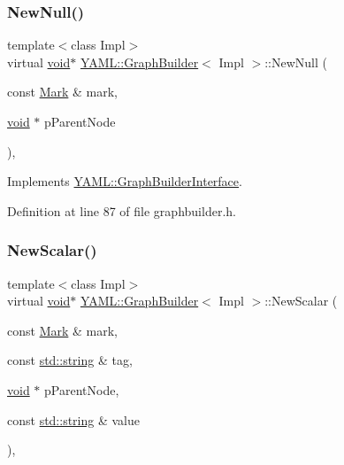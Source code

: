 \subsubsection{\texorpdfstring{NewNull()}{NewNull()}}
{\footnotesize\ttfamily template$<$class Impl$>$ \\
virtual \mbox{\hyperlink{glad_8h_a950fc91edb4504f62f1c577bf4727c29}{void}}$\ast$ \mbox{\hyperlink{class_y_a_m_l_1_1_graph_builder}{Y\+A\+M\+L\+::\+Graph\+Builder}}$<$ Impl $>$\+::New\+Null (\begin{DoxyParamCaption}\item[{const \mbox{\hyperlink{struct_y_a_m_l_1_1_mark}{Mark}} \&}]{mark,  }\item[{\mbox{\hyperlink{glad_8h_a950fc91edb4504f62f1c577bf4727c29}{void}} $\ast$}]{p\+Parent\+Node }\end{DoxyParamCaption})\hspace{0.3cm}{\ttfamily [inline]}, {\ttfamily [virtual]}}



Implements \mbox{\hyperlink{class_y_a_m_l_1_1_graph_builder_interface_a85e609e41a4552f135e34c9544a8e197}{Y\+A\+M\+L\+::\+Graph\+Builder\+Interface}}.



Definition at line 87 of file graphbuilder.\+h.

\mbox{\label{class_y_a_m_l_1_1_graph_builder_a8601c82a8c24fd4bb2e9e84b5f5d3316}} 
\subsubsection{\texorpdfstring{NewScalar()}{NewScalar()}}
{\footnotesize\ttfamily template$<$class Impl$>$ \\
virtual \mbox{\hyperlink{glad_8h_a950fc91edb4504f62f1c577bf4727c29}{void}}$\ast$ \mbox{\hyperlink{class_y_a_m_l_1_1_graph_builder}{Y\+A\+M\+L\+::\+Graph\+Builder}}$<$ Impl $>$\+::New\+Scalar (\begin{DoxyParamCaption}\item[{const \mbox{\hyperlink{struct_y_a_m_l_1_1_mark}{Mark}} \&}]{mark,  }\item[{const \mbox{\hyperlink{glad_8h_ac83513893df92266f79a515488701770}{std\+::string}} \&}]{tag,  }\item[{\mbox{\hyperlink{glad_8h_a950fc91edb4504f62f1c577bf4727c29}{void}} $\ast$}]{p\+Parent\+Node,  }\item[{const \mbox{\hyperlink{glad_8h_ac83513893df92266f79a515488701770}{std\+::string}} \&}]{value }\end{DoxyParamCaption})\hspace{0.3cm}{\ttfamily [inline]}, {\ttfamily [virtual]}}



